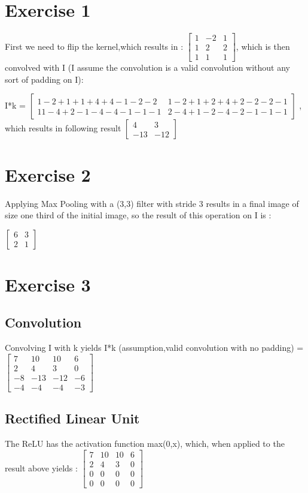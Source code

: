 \documentclass[10pt]{article}
\begin{document}
\section{Exercise 1}

First we need to flip the kernel,which results in :
$\begin{bmatrix}
1&-2&1\\
1&2&2\\
1&1&1
\end{bmatrix}$, which is then convolved with I (I assume the convolution is a valid convolution without any sort of padding on I):

I*k = $\begin{bmatrix}
1-2+1+1+4+4-1-2-2&1-2+1+2+4+2-2-2-1\\
11-4+2-1-4-4-1-1-1&2-4+1-2-4-2-1-1-1
\end{bmatrix}$
, which results in following result
$\begin{bmatrix}
4&3\\
-13&-12
\end{bmatrix}$


\section{Exercise 2}
Applying Max Pooling with a (3,3) filter with stride 3 results in a final image of size one third of the initial image, so the result of this operation on I is :

$\begin{bmatrix}
6&3\\
2&1
\end{bmatrix}$

\section{Exercise 3}
\subsection{Convolution}
Convolving I with k yields I*k (assumption,valid convolution with no padding) =
$\begin{bmatrix}
7&10&10&6\\
2&4&3&0\\
-8&-13&-12&-6\\
-4&-4&-4&-3
\end{bmatrix}$

\subsection{Rectified Linear Unit}
The ReLU has the activation function max(0,x), which, when applied to the result above yields : $\begin{bmatrix}
7&10&10&6\\
2&4&3&0\\
0&0&0&0\\
0&0&0&0
\end{bmatrix}$
\end{document}
